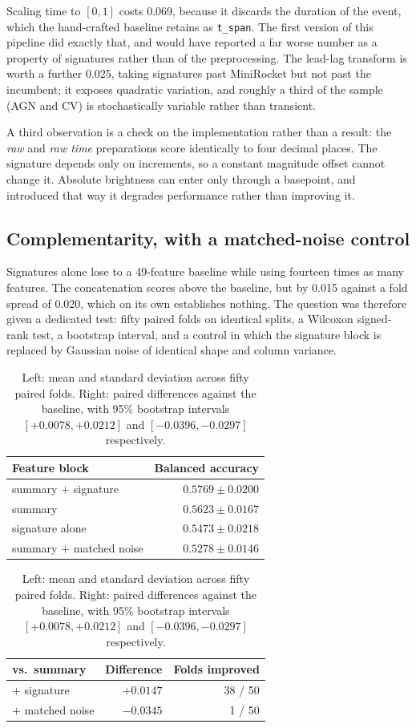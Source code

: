 \documentclass[11pt,a4paper]{report}
\begin{document}
Scaling time to $[0,1]$ costs 0.069, because it discards the duration of the event, which
the hand-crafted baseline retains as \texttt{t\_span}. The first version of this pipeline
did exactly that, and would have reported a far worse number as a property of signatures
rather than of the preprocessing. The lead-lag transform is worth a further 0.025, taking
signatures past MiniRocket but not past the incumbent; it exposes quadratic variation, and
roughly a third of the sample (AGN and CV) is stochastically variable rather than transient.

A third observation is a check on the implementation rather than a result: the \emph{raw}
and \emph{raw time} preparations score identically to four decimal places. The signature
depends only on increments, so a constant magnitude offset cannot change it. Absolute
brightness can enter only through a basepoint, and introduced that way it degrades
performance rather than improving it.

\subsection{Complementarity, with a matched-noise control}

Signatures alone lose to a 49-feature baseline while using fourteen times as many features.
The concatenation scores above the baseline, but by 0.015 against a fold spread of 0.020,
which on its own establishes nothing. The question was therefore given a dedicated test:
fifty paired folds on identical splits, a Wilcoxon signed-rank test, a bootstrap interval,
and a control in which the signature block is replaced by Gaussian noise of identical shape
and column variance.

\begin{table}[h]
\centering
\small
\begin{tabular}{lr}
\toprule
Feature block & Balanced accuracy \\
\midrule
summary $+$ signature & $\mathbf{0.5769 \pm 0.0200}$ \\
summary & $0.5623 \pm 0.0167$ \\
signature alone & $0.5473 \pm 0.0218$ \\
summary $+$ matched noise & $0.5278 \pm 0.0146$ \\
\bottomrule
\end{tabular}
\hspace{1em}
\begin{tabular}{lrr}
\toprule
vs.\ summary & Difference & Folds improved \\
\midrule
$+$ signature & $+0.0147$ & 38 / 50 \\
$+$ matched noise & $-0.0345$ & 1 / 50 \\
\bottomrule
\end{tabular}
\caption{Left: mean and standard deviation across fifty paired folds. Right: paired
differences against the baseline, with 95\% bootstrap intervals $[+0.0078, +0.0212]$ and
$[-0.0396, -0.0297]$ respectively.}
\end{table}
\end{document}
